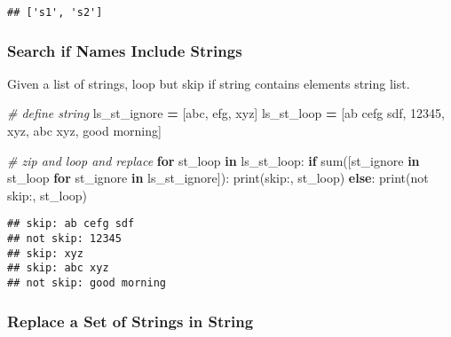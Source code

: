 \documentclass[
]{book}
\newenvironment{Shaded}{\begin{snugshade}}{\end{snugshade}}
\newcommand{\BuiltInTok}[1]{#1}
\newcommand{\CommentTok}[1]{\textcolor[rgb]{0.56,0.35,0.01}{\textit{#1}}}
\newcommand{\ControlFlowTok}[1]{\textcolor[rgb]{0.13,0.29,0.53}{\textbf{#1}}}
\newcommand{\KeywordTok}[1]{\textcolor[rgb]{0.13,0.29,0.53}{\textbf{#1}}}
\newcommand{\NormalTok}[1]{#1}
\newcommand{\OperatorTok}[1]{\textcolor[rgb]{0.81,0.36,0.00}{\textbf{#1}}}
\newcommand{\StringTok}[1]{\textcolor[rgb]{0.31,0.60,0.02}{#1}}
\begin{document}
\begin{verbatim}
## ['s1', 's2']
\end{verbatim}

\hypertarget{search-if-names-include-strings}{%
\subsubsection{Search if Names Include Strings}\label{search-if-names-include-strings}}

Given a list of strings, loop but skip if string contains elements string list.

\begin{Shaded}
\begin{Highlighting}[]
\CommentTok{\# define string}
\NormalTok{ls\_st\_ignore }\OperatorTok{=}\NormalTok{ [}\StringTok{\textquotesingle{}abc\textquotesingle{}}\NormalTok{, }\StringTok{\textquotesingle{}efg\textquotesingle{}}\NormalTok{, }\StringTok{\textquotesingle{}xyz\textquotesingle{}}\NormalTok{]}
\NormalTok{ls\_st\_loop }\OperatorTok{=}\NormalTok{ [}\StringTok{\textquotesingle{}ab cefg sdf\textquotesingle{}}\NormalTok{, }\StringTok{\textquotesingle{}12345\textquotesingle{}}\NormalTok{, }\StringTok{\textquotesingle{}xyz\textquotesingle{}}\NormalTok{, }\StringTok{\textquotesingle{}abc xyz\textquotesingle{}}\NormalTok{, }\StringTok{\textquotesingle{}good morning\textquotesingle{}}\NormalTok{]}

\CommentTok{\# zip and loop and replace}
\ControlFlowTok{for}\NormalTok{ st\_loop }\KeywordTok{in}\NormalTok{ ls\_st\_loop:}
  \ControlFlowTok{if} \BuiltInTok{sum}\NormalTok{([st\_ignore }\KeywordTok{in}\NormalTok{ st\_loop }\ControlFlowTok{for}\NormalTok{ st\_ignore }\KeywordTok{in}\NormalTok{ ls\_st\_ignore]):}
    \BuiltInTok{print}\NormalTok{(}\StringTok{\textquotesingle{}skip:\textquotesingle{}}\NormalTok{, st\_loop)}
  \ControlFlowTok{else}\NormalTok{:}
    \BuiltInTok{print}\NormalTok{(}\StringTok{\textquotesingle{}not skip:\textquotesingle{}}\NormalTok{, st\_loop)}
\end{Highlighting}
\end{Shaded}

\begin{verbatim}
## skip: ab cefg sdf
## not skip: 12345
## skip: xyz
## skip: abc xyz
## not skip: good morning
\end{verbatim}

\hypertarget{replace-a-set-of-strings-in-string}{%
\subsubsection{Replace a Set of Strings in String}\label{replace-a-set-of-strings-in-string}}
\end{document}

